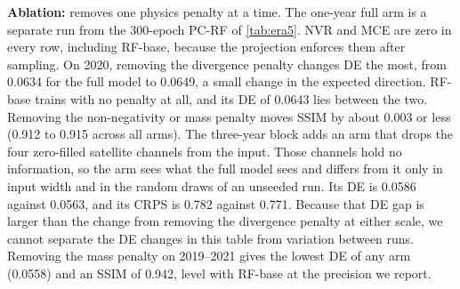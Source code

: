 \documentclass[sigconf,nonacm]{acmart}
\newcommand{\pcrf}{\textsc{PC-RF}\xspace}
\begin{document}
\textbf{Ablation:}  removes one physics penalty at a time. The one-year full arm is a separate run from the 300-epoch \pcrf of \cref{tab:era5}. NVR and MCE are zero in every row, including RF-base, because the projection enforces them after sampling. On 2020, removing the divergence penalty changes DE the most, from 0.0634 for the full model to 0.0649, a small change in the expected direction. RF-base trains with no penalty at all, and its DE of 0.0643 lies between the two. Removing the non-negativity or mass penalty moves SSIM by about 0.003 or less (0.912 to 0.915 across all arms). The three-year block adds an arm that drops the four zero-filled satellite channels from the input. Those channels hold no information, so the arm sees what the full model sees and differs from it only in input width and in the random draws of an unseeded run. Its DE is 0.0586 against 0.0563, and its CRPS is 0.782 against 0.771. Because that DE gap is larger than the change from removing the divergence penalty at either scale, we cannot separate the DE changes in this table from variation between runs. Removing the mass penalty on 2019--2021 gives the lowest DE of any arm (0.0558) and an SSIM of 0.942, level with RF-base at the precision we report.
\end{document}
